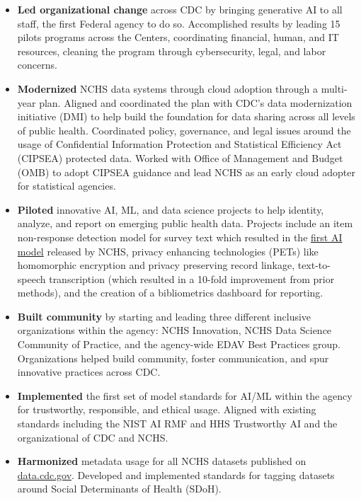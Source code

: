 \documentclass[]{scrartcl}
\begin{document}
\begin{cleanCV}
{\begin{itemize}
  \item \textbf{Led organizational change} across CDC by bringing generative AI to all staff, the first Federal agency to do so. Accomplished results by leading 15 pilots programs across the Centers, coordinating financial, human, and IT resources, cleaning the program through cybersecurity, legal, and labor concerns.

  \item \textbf{Modernized} NCHS data systems through cloud adoption through a multi-year plan. Aligned and coordinated the plan with CDC's data modernization initiative (DMI) to help build the foundation for data sharing across all levels of public health. Coordinated policy, governance, and legal issues around the usage of Confidential Information Protection and Statistical Efficiency Act (CIPSEA) protected data. Worked with Office of Management and Budget (OMB) to adopt CIPSEA guidance and lead NCHS as an early cloud adopter for statistical agencies.
    
  \item \textbf{Piloted} innovative AI, ML, and data science projects to help identity, analyze, and report on emerging public health data. Projects include an item non-response detection model for survey text which resulted in the \href{https://www.cdc.gov/nchs/data-science/SANDS-model-context.htm}{first AI model} released by NCHS, privacy enhancing technologies (PETs) like homomorphic encryption and privacy preserving record linkage, text-to-speech transcription (which resulted in a 10-fold improvement from prior methods), and the creation of a bibliometrics dashboard for reporting.

      \item \textbf{Built community} by starting and leading three different inclusive organizations within the agency: NCHS Innovation, NCHS Data Science Community of Practice, and the agency-wide EDAV Best Practices group. Organizations helped build community, foster communication, and spur innovative practices across CDC.
    
  \item \textbf{Implemented} the first set of model standards for AI/ML within the agency for trustworthy, responsible, and ethical usage. Aligned with existing standards including the NIST AI RMF and HHS Trustworthy AI and the organizational of CDC and NCHS. 

  \item \textbf{Harmonized} metadata usage for all NCHS datasets published on \href{https://data.cdc.gov/browse?category=NCHS}{data.cdc.gov}. Developed and implemented standards for tagging datasets around Social Determinants of Health (SDoH).
    

\end{itemize}}
\end{cleanCV}
\end{document}
